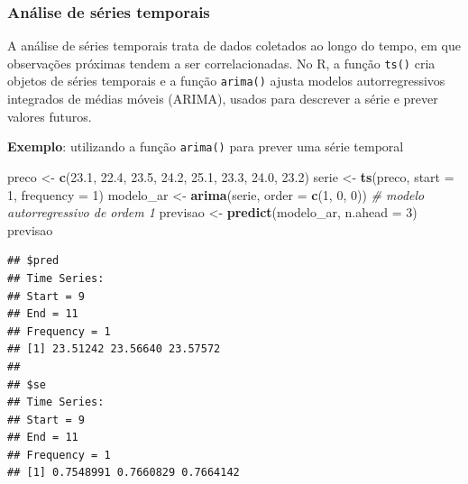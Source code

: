 \documentclass[
]{book}
\newenvironment{Shaded}{\begin{snugshade}}{\end{snugshade}}
\newcommand{\AttributeTok}[1]{\textcolor[rgb]{0.13,0.29,0.53}{#1}}
\newcommand{\CommentTok}[1]{\textcolor[rgb]{0.56,0.35,0.01}{\textit{#1}}}
\newcommand{\DecValTok}[1]{\textcolor[rgb]{0.00,0.00,0.81}{#1}}
\newcommand{\FloatTok}[1]{\textcolor[rgb]{0.00,0.00,0.81}{#1}}
\newcommand{\FunctionTok}[1]{\textcolor[rgb]{0.13,0.29,0.53}{\textbf{#1}}}
\newcommand{\NormalTok}[1]{#1}
\newcommand{\OtherTok}[1]{\textcolor[rgb]{0.56,0.35,0.01}{#1}}
\begin{document}
\subsubsection{Análise de séries temporais}\label{anuxe1lise-de-suxe9ries-temporais}

A análise de séries temporais trata de dados coletados ao longo do tempo, em que observações próximas tendem a ser correlacionadas. No R, a função \texttt{ts()} cria objetos de séries temporais e a função \texttt{arima()} ajusta modelos autorregressivos integrados de médias móveis (ARIMA), usados para descrever a série e prever valores futuros.

\textbf{Exemplo}: utilizando a função \texttt{arima()} para prever uma série temporal

\begin{Shaded}
\begin{Highlighting}[]
\NormalTok{preco }\OtherTok{\textless{}{-}} \FunctionTok{c}\NormalTok{(}\FloatTok{23.1}\NormalTok{, }\FloatTok{22.4}\NormalTok{, }\FloatTok{23.5}\NormalTok{, }\FloatTok{24.2}\NormalTok{, }\FloatTok{25.1}\NormalTok{, }\FloatTok{23.3}\NormalTok{, }\FloatTok{24.0}\NormalTok{, }\FloatTok{23.2}\NormalTok{)}
\NormalTok{serie }\OtherTok{\textless{}{-}} \FunctionTok{ts}\NormalTok{(preco, }\AttributeTok{start =} \DecValTok{1}\NormalTok{, }\AttributeTok{frequency =} \DecValTok{1}\NormalTok{)}
\NormalTok{modelo\_ar }\OtherTok{\textless{}{-}} \FunctionTok{arima}\NormalTok{(serie, }\AttributeTok{order =} \FunctionTok{c}\NormalTok{(}\DecValTok{1}\NormalTok{, }\DecValTok{0}\NormalTok{, }\DecValTok{0}\NormalTok{))   }\CommentTok{\# modelo autorregressivo de ordem 1}
\NormalTok{previsao }\OtherTok{\textless{}{-}} \FunctionTok{predict}\NormalTok{(modelo\_ar, }\AttributeTok{n.ahead =} \DecValTok{3}\NormalTok{)}
\NormalTok{previsao}
\end{Highlighting}
\end{Shaded}

\begin{verbatim}
## $pred
## Time Series:
## Start = 9 
## End = 11 
## Frequency = 1 
## [1] 23.51242 23.56640 23.57572
## 
## $se
## Time Series:
## Start = 9 
## End = 11 
## Frequency = 1 
## [1] 0.7548991 0.7660829 0.7664142
\end{verbatim}
\end{document}
